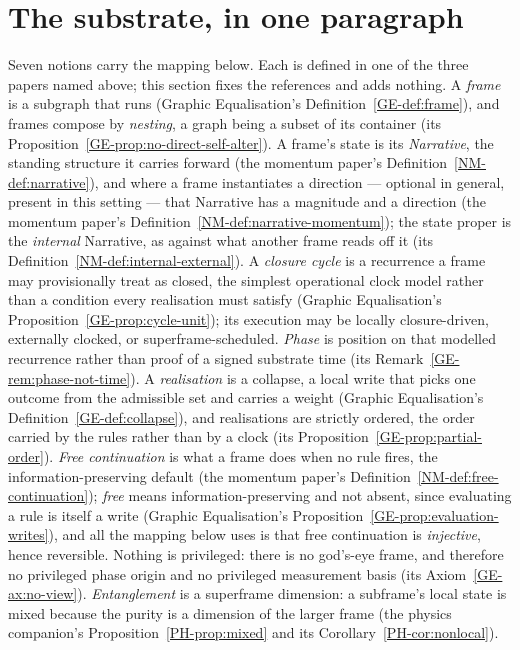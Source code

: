 \documentclass[11pt,a4paper]{article}
\theoremstyle{remark}\newtheorem{remark}[definition]{Remark}
\begin{document}
\section{The substrate, in one paragraph}\label{sec:substrate}
Seven notions carry the mapping below. Each is defined in one of the three papers
named above; this section fixes the references and adds nothing.
A \emph{frame} is a subgraph that runs (Graphic Equalisation's
Definition~\ref{GE-def:frame}), and frames compose by \emph{nesting}, a graph being a
subset of its container (its Proposition~\ref{GE-prop:no-direct-self-alter}).
A frame's state is its \emph{Narrative}, the standing structure it carries forward
(the momentum paper's Definition~\ref{NM-def:narrative}), and where a frame
instantiates a direction --- optional in general, present in this setting --- that
Narrative has a magnitude and a direction (the momentum paper's
Definition~\ref{NM-def:narrative-momentum}); the state proper is the \emph{internal}
Narrative, as against what another frame reads off it (its
Definition~\ref{NM-def:internal-external}).
A \emph{closure cycle} is a recurrence a frame may provisionally treat as closed,
the simplest operational clock model rather than a condition every realisation must satisfy
(Graphic Equalisation's Proposition~\ref{GE-prop:cycle-unit}); its execution may be locally
closure-driven, externally clocked, or superframe-scheduled. \emph{Phase} is position on that
modelled recurrence rather than proof of a signed substrate time (its
Remark~\ref{GE-rem:phase-not-time}).
A \emph{realisation} is a collapse, a local write that picks one outcome from the
admissible set and carries a weight (Graphic Equalisation's
Definition~\ref{GE-def:collapse}), and
realisations are strictly ordered, the order carried by the rules rather than by a
clock (its Proposition~\ref{GE-prop:partial-order}).
\emph{Free continuation} is what a frame does when no rule fires, the
information-preserving default (the momentum paper's
Definition~\ref{NM-def:free-continuation}); \emph{free} means information-preserving
and not absent, since evaluating a rule is itself a write (Graphic Equalisation's
Proposition~\ref{GE-prop:evaluation-writes}), and all the mapping below uses is that
free continuation is \emph{injective}, hence reversible.
Nothing is privileged: there is no god's-eye frame, and therefore no privileged phase
origin and no privileged measurement basis (its Axiom~\ref{GE-ax:no-view}).
\emph{Entanglement} is a superframe dimension: a subframe's local state is mixed
because the purity is a dimension of the larger frame (the physics companion's
Proposition~\ref{PH-prop:mixed} and its Corollary~\ref{PH-cor:nonlocal}).
\end{document}
